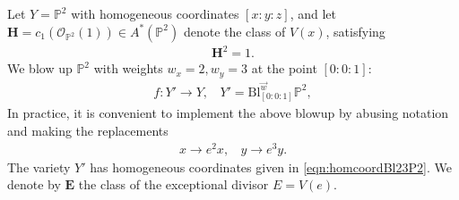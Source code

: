 \documentclass[11pt,oneside,english]{article}
\numberwithin{equation}{section}
\theoremstyle{definition}
\begin{document}
Let $Y = \mathbb P^2$ with homogeneous coordinates $[x:y:z]$, and let
$\boldsymbol{H}	= c_1(\mathcal O_{\mathbb P^2}(1)) \in A^*(\mathbb P^2)$ denote the class of $V(x)$, satisfying
	\begin{align}
		\boldsymbol{H}^2 = 1. 
	\end{align}
We blow up $\mathbb P^2$ with weights $w_x = 2, w_y = 3$ at the point $[0:0:1]$:
	\begin{align}
		f : Y'  \rightarrow Y,~~~~ Y' = \text{Bl}_{[0:0:1]}^{\vec w} \mathbb P^2,
	\end{align}
In practice, it is convenient to implement the above blowup by abusing notation and making the replacements
	\begin{align}	
		x \rightarrow e^2 x, ~~~~ y \rightarrow e^3 y. 
	\end{align}
The variety $Y'$ has homogeneous coordinates given in \cref{eqn:homcoordBl23P2}.
We denote by $\boldsymbol{E}$ the class of the exceptional divisor $E = V(e)$.
\end{document}
